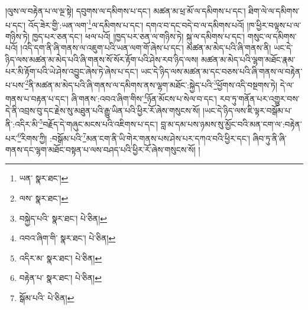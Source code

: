 །ལུས་ལ་བརྟེན་པ་ལ་ལྔ་སྟེ། དབུགས་ལ་དམིགས་པ་དང་། མཚན་མ་ཕྲ་མོ་ལ་དམིགས་པ་དང་། ཐིག་ལེ་ལ་དམིགས་པ་དང་། འོད་ཟེར་གྱི་:ཡན་ལག་\footnote{ཡན་  སྣར་ཐང་། }ལ་དམིགས་པ་དང་། དགའ་བ་དང་བདེ་བ་ལ་དམིགས་པའོ། །ཁ་ཕྱིར་བལྟས་པ་ལ་གཉིས་ཏེ། ཁྱད་པར་ཅན་དང་། ཕལ་པའོ། །ཁྱད་པར་ཅན་ལ་གཉིས་ཏེ། སྐུ་ལ་དམིགས་པ་དང་། གསུང་ལ་དམིགས་པའོ། །འདི་དག་ནི་ཞི་གནས་ལ་འཇུག་པའི་ཡན་ལག་གོ་ཞེས་པ་དང་། མཚན་མ་མེད་པའི་ཞི་གནས་ནི། ཡང་དེ་ཉིད་ལས་མཚན་མ་མེད་པའི་ཞི་གནས་སོ་སོར་རྟོག་པའི་ཤེས་རབ་ཉིད་ལས། མཚན་མ་མེད་པའི་ལྷག་མཐོང་རྣམ་པར་མི་རྟོག་པའི་ཡེ་ཤེས་འབྱུང་ཞེས་ཏེ་ཞེས་པ་དང་། ཡང་དེ་ཉིད་ལས་མཚན་མ་དང་བཅས་པའི་ཞི་གནས་ལ་བརྟེན་པ་པས་\footnote{ལས་  སྣར་ཐང་། }ནི་མཚན་མ་མེད་པའི་ཞི་གནས་ལ་དམིགས་ནས་ལྷག་མཐོང་:སྐྱེད་པའི་\footnote{བསྐྱེད་པའི་  སྣར་ཐང་།  པེ་ཅིན། }ཕྱོགས་འདི་བསྔགས་ཏེ། དེ་ལ་གནས་པ་བརྟན་པ་དང་། ཞི་གནས་:འབའ་ཞིག་གིས་\footnote{འབའ་ཞིག་གི་  སྣར་ཐང་།  པེ་ཅིན། }ཉོན་མོངས་པ་སེལ་བ་དང་། རབ་ཏུ་གནོན་པར་འགྱུར་བས་དེ་ནི་འབྲས་བུ་དང་རྗེས་སུ་མཐུན་པའི་རྒྱུ་ཡིན་པའི་ཕྱིར་རོ་ཞེས་གསུངས་སོ། །ཡང་དེ་ཉིད་ལས་ཇི་ལྟར་བསྒོམ་པ་ནི་:འདིར་མི་\footnote{འདིར་མ་  སྣར་ཐང་།  པེ་ཅིན། }བརྗོད་དེ་གཞུང་མངས་པའི་འཇིགས་པ་དང་། བླ་མ་དམ་པས་ཉམས་སུ་མྱོང་བའི་མན་ངག་ལ་:བརྟེན་པར་\footnote{བརྟེན་པ་  སྣར་ཐང་།  པེ་ཅིན། }རིགས་ཀྱི། :བསྒོམ་པའི་\footnote{སྒོམ་པའི་  པེ་ཅིན། }མན་ངག་ནི་ཡི་གེར་གནས་པས་ཤེས་པར་དཀའ་བའི་ཕྱིར་དང་། ཞིབ་ཏུ་ནི་ཞི་གནས་དང་ལྷག་མཐོང་བསྟན་པ་ལས་བཤད་པའི་ཕྱིར་རོ་ཞེས་གསུངས་སོ། །
